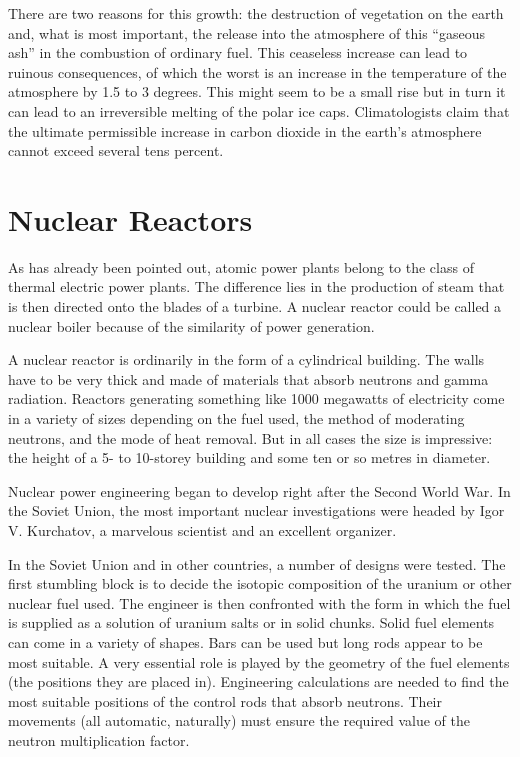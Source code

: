 There are two reasons for this growth: the destruction of vegetation on the earth and, what is most important, the release into the atmosphere of this ``gaseous ash'' in the combustion of ordinary fuel. This ceaseless increase can lead to ruinous consequences, of which the worst is an increase in the temperature of the atmosphere by 1.5 to 3 degrees. This might seem to be a small rise but in turn it can lead to an irreversible melting of the polar ice caps. Climatologists claim that the ultimate permissi­ble increase in carbon dioxide in the earth's atmosphere cannot exceed several tens percent.

\section{Nuclear Reactors}

As has already been pointed out, atomic power plants belong to the class of thermal electric power plants. The difference lies in the production of steam that is then directed onto the blades of a turbine. A nuclear reactor could be called a nuclear boiler because of the similarity of power generation.

A nuclear reactor is ordinarily in the form of a cylin­drical building. The walls have to be very thick and made of materials that absorb neutrons and gamma radia­tion. Reactors generating something like 1000 megawatts of electricity come in a variety of sizes depending on the fuel used, the method of moderating neutrons, and the mode of heat removal. But in all cases the size is impres­sive: the height of a 5- to 10-storey building and some ten or so metres in diameter.

Nuclear power engineering began to develop right after the Second World War. In the Soviet Union, the most important nuclear investigations were headed by Igor V. Kurchatov, a marvelous scientist and an excellent organizer.

In the Soviet Union and in other countries, a number of designs were tested. The first stumbling block is to decide the isotopic composition of the uranium or other nuclear fuel used. The engineer is then confronted with the form in which the fuel is supplied as a solution of uranium salts or in solid chunks. Solid fuel elements can come in a variety of shapes. Bars can be used but long rods appear to be most suitable. A very essential role is played by the geometry of the fuel elements (the positions they are placed in). Engineering calculations are needed to find the most suitable positions of the con­trol rods that absorb neutrons. Their movements (all auto­matic, naturally) must ensure the required value of the neutron multiplication factor.

